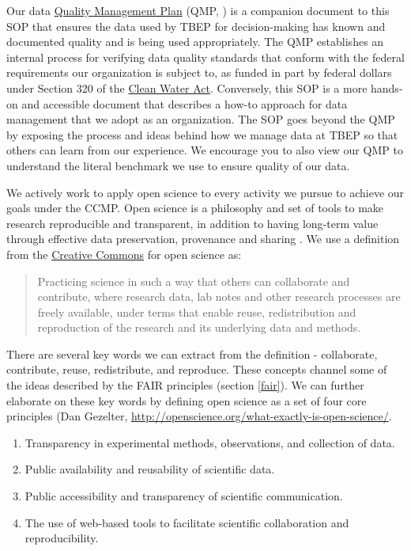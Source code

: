 \documentclass[
]{book}
\providecommand{\tightlist}{%
  \setlength{\itemsep}{0pt}\setlength{\parskip}{0pt}}
\begin{document}
Our data \href{https://drive.google.com/file/d/1DyA0PNHV8rEXGMwGiyS7sXY1ECLYpJJO/view}{Quality Management Plan} (QMP, \citet{tbep1620}) is a companion document to this SOP that ensures the data used by TBEP for decision-making has known and documented quality and is being used appropriately. The QMP establishes an internal process for verifying data quality standards that conform with the federal requirements our organization is subject to, as funded in part by federal dollars under Section 320 of the \href{https://www.epa.gov/laws-regulations/summary-clean-water-act}{Clean Water Act}. Conversely, this SOP is a more hands-on and accessible document that describes a how-to approach for data management that we adopt as an organization. The SOP goes beyond the QMP by exposing the process and ideas behind how we manage data at TBEP so that others can learn from our experience. We encourage you to also view our QMP to understand the literal benchmark we use to ensure quality of our data.

We actively work to apply open science to every activity we pursue to achieve our goals under the CCMP. Open science is a philosophy and set of tools to make research reproducible and transparent, in addition to having long-term value through effective data preservation, provenance and sharing \citep{Beck20}. We use a definition from the \href{https://creativecommons.org/about/program-areas/open-science/}{Creative Commons} for open science as:

\begin{quote}
Practicing science in such a way that others can collaborate and contribute, where research data, lab notes and other research processes are freely available, under terms that enable reuse, redistribution and reproduction of the research and its underlying data and methods.
\end{quote}

There are several key words we can extract from the definition - collaborate, contribute, reuse, redistribute, and reproduce. These concepts channel some of the ideas described by the FAIR principles (section \ref{fair}). We can further elaborate on these key words by defining open science as a set of four core principles (Dan Gezelter, \url{http://openscience.org/what-exactly-is-open-science/}.

\begin{enumerate}
\def\labelenumi{\arabic{enumi}.}
\tightlist
\item
  Transparency in experimental methods, observations, and collection of data.
\item
  Public availability and reusability of scientific data.
\item
  Public accessibility and transparency of scientific communication.
\item
  The use of web-based tools to facilitate scientific collaboration and reproducibility.
\end{enumerate}
\end{document}
